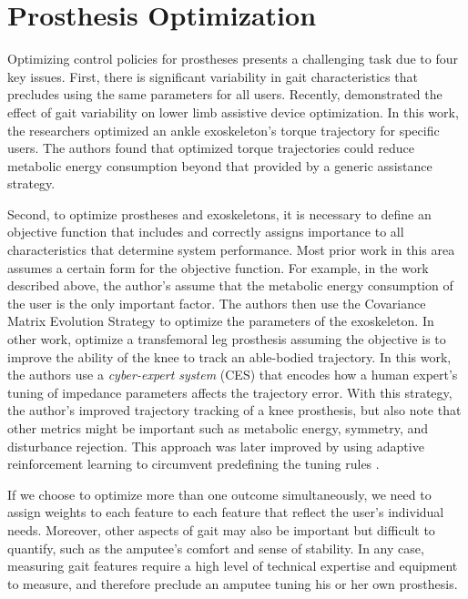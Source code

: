 \section{Prosthesis Optimization}\label{sec:back_optimization}

Optimizing control policies for prostheses presents a challenging task due to
four key issues. First, there is significant variability in gait characteristics
that precludes using the same parameters for all users. Recently,
\citet{zhang2017human} demonstrated the effect of gait variability on lower limb
assistive device optimization. In this work, the researchers optimized an ankle
exoskeleton's torque trajectory for specific users. The authors found that
optimized torque trajectories could reduce metabolic energy consumption beyond
that provided by a generic assistance strategy.
 
Second, to optimize prostheses and exoskeletons, it is necessary to define an
objective function that includes and correctly assigns importance to all
characteristics that determine system performance. Most prior work in this area
assumes a certain form for the objective function. For example, in the work
described above, the author's assume that the metabolic energy consumption of
the user is the only important factor. The authors then use the Covariance
Matrix Evolution Strategy \citep{hansen2006cma} to optimize the parameters of
the exoskeleton. In other work, \citet{huang2016cyber} optimize a transfemoral
leg prosthesis assuming the objective is to improve the ability of the knee to
track an able-bodied trajectory. In this work, the authors use a
\emph{cyber-expert system} (CES) that encodes how a human expert's tuning of
impedance parameters affects the trajectory error. With this strategy, the
author's improved trajectory tracking of a knee prosthesis, but also note that
other metrics might be important such as metabolic energy, symmetry, and
disturbance rejection. This approach was later improved by using adaptive
reinforcement learning to circumvent predefining the tuning rules
\citep{wen2016adaptive,wen2019online}. 

If we choose to optimize more than one outcome simultaneously, we need to
assign weights to each feature to each feature that reflect the user's individual
needs. Moreover, other aspects of gait may also be important but difficult to
quantify, such as the amputee's comfort and sense of stability. In any case,
measuring gait features require a high level of technical expertise and
equipment to measure, and therefore preclude an amputee tuning his or her own
prosthesis.

